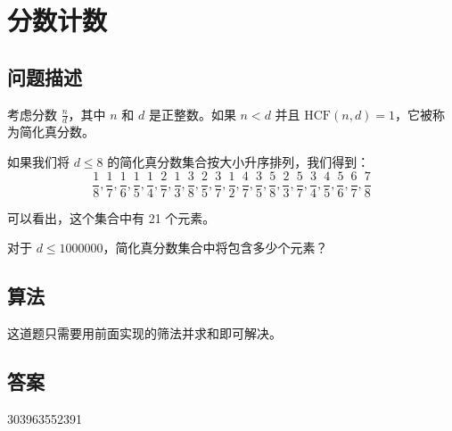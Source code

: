 \section{分数计数}
\subsection{问题描述}
\begin{tcolorbox}

考虑分数 \( \frac{n}{d} \)，其中 \( n \) 和 \( d \) 是正整数。如果 \( n < d \) 并且 \( \text{HCF}(n, d) = 1 \)，它被称为简化真分数。

如果我们将 \( d \leq 8 \) 的简化真分数集合按大小升序排列，我们得到：
\[ \frac{1}{8}, \frac{1}{7}, \frac{1}{6}, \frac{1}{5}, \frac{1}{4}, \frac{2}{7}, \frac{1}{3}, \frac{3}{8}, \frac{2}{5}, \frac{3}{7}, \frac{1}{2}, \frac{4}{7}, \frac{3}{5}, \frac{5}{8}, \frac{2}{3}, \frac{5}{7}, \frac{3}{4}, \frac{4}{5}, \frac{5}{6}, \frac{6}{7}, \frac{7}{8} \]

可以看出，这个集合中有 21 个元素。

对于 \( d \leq 1000000 \)，简化真分数集合中将包含多少个元素？
\end{tcolorbox}

\subsection{算法}
这道题只需要用前面实现的筛法并求和即可解决。

\subsection{答案}
303963552391
